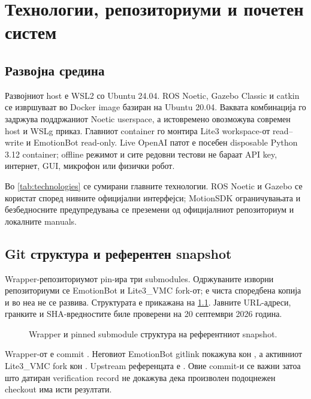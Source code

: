 \chapter{Технологии, репозиториуми и почетен систем}
\label{chap:technology}

\section{Развојна средина}

Развојниот host е WSL2 со Ubuntu 24.04. ROS Noetic, Gazebo Classic и catkin се
извршуваат во Docker image базиран на Ubuntu 20.04. Ваквата комбинација го
задржува поддржаниот Noetic userspace, а истовремено овозможува современ host и
WSLg приказ. Главниот container го монтира Lite3 workspace-от read--write и
EmotionBot read-only. Live OpenAI патот е посебен disposable Python 3.12
container; offline режимот и сите редовни тестови не бараат API key, интернет,
GUI, микрофон или физички робот.

Во \cref{tab:technologies} се сумирани главните технологии. ROS Noetic и
Gazebo се користат според нивните официјални интерфејси; MotionSDK ограничувањата и безбедносните
предупредувања се преземени од официјалниот репозиториум и локалните manuals.



\section{Git структура и референтен snapshot}

Wrapper-репозиториумот pin-ира три submodules. Одржуваните изворни
репозиториуми се EmotionBot и Lite3\_VMC fork-от; 
е чиста споредбена копија и во неа не се развива. Структурата е прикажана на
\cref{fig:repo-structure}. Јавните URL-адреси, гранките и SHA-вредностите биле
проверени на 20 септември 2026 година.

\begin{figure}[htbp]
\centering
\resizebox{\textwidth}{!}{}
\caption{Wrapper и pinned submodule структура на референтниот snapshot.}
\label{fig:repo-structure}
\end{figure}

Wrapper-от е commit
. Неговиот EmotionBot gitlink
покажува кон , а активниот
Lite3\_VMC fork кон . Upstream
референцата е . Овие commit-и
се важни затоа што датиран verification record не докажува дека произволен
подоцнежен checkout има исти резултати.

